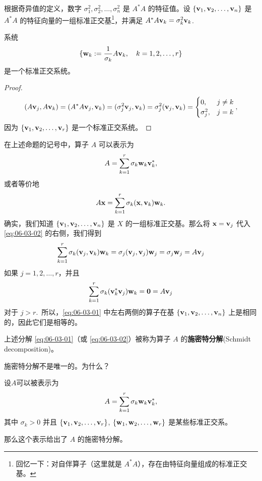 根据奇异值的定义，数字 $\sigma_1^2, \sigma_2^2, \dots, \sigma_n^2$ 是 $A^*A$ 的特征值。设 $\{\mathbf{v}_1, \mathbf{v}_2, \dots, \mathbf{v}_n\}$ 是 $A^*A$ 的特征向量的一组标准正交基\footnote{回忆一下：对自伴算子（这里就是 $A^*A$），存在由特征向量组成的标准正交基。}，并满足 $A^*A\mathbf{v}_k = \sigma_k^2 \mathbf{v}_k$.~

\begin{proposition}\label{stmt:06-03-06}
系统
$$\{\mathbf{w}_k := \frac{1}{\sigma_k} A\mathbf{v}_k,\quad k = 1, 2, \dots, r\}$$
是一个标准正交系统。
\end{proposition}

\begin{proof}$$(A\mathbf{v}_j, A\mathbf{v}_k) = (A^*A\mathbf{v}_j, \mathbf{v}_k) = (\sigma_j^2 \mathbf{v}_j, \mathbf{v}_k) = \sigma_j^2 (\mathbf{v}_j, \mathbf{v}_k) = \begin{cases} 0, & j \neq k \\ \sigma_j^2, & j = k \end{cases},$$因为 $\{\mathbf{v}_1, \mathbf{v}_2, \dots, \mathbf{v}_r\}$ 是一个标准正交系统。\end{proof}

在上述命题的记号中，算子 $A$ 可以表示为
\begin{equation}\label{eq:06-03-01}
A = \sum_{k=1}^r \sigma_k \mathbf{w}_k \mathbf{v}_k^*,
\end{equation}
或者等价地
\begin{equation}\label{eq:06-03-02}
A\mathbf{x} = \sum_{k=1}^r \sigma_k (\mathbf{x}, \mathbf{v}_k) \mathbf{w}_k.
\end{equation}
确实，我们知道 $\{\mathbf{v}_1, \mathbf{v}_2, \dots, \mathbf{v}_n\}$ 是 $X$ 的一组标准正交基。那么将 $\mathbf{x} = \mathbf{v}_j$ 代入 \eqref{eq:06-03-02} 的右侧，我们得到
$$\sum_{k=1}^r \sigma_k (\mathbf{v}_j, \mathbf{v}_k) \mathbf{w}_k = \sigma_j (\mathbf{v}_j, \mathbf{v}_j) \mathbf{w}_j = \sigma_j \mathbf{w}_j = A\mathbf{v}_j$$
如果 $j=1, 2, \dots, r$，并且
$$\sum_{k=1}^r \sigma_k (\mathbf{v}_k^* \mathbf{v}_j) \mathbf{w}_k = \mathbf{0} = A\mathbf{v}_j$$ 对于 $j > r$.~所以，\eqref{eq:06-03-01} 中左右两侧的算子在基 $\{\mathbf{v}_1, \mathbf{v}_2, \dots, \mathbf{v}_n\}$ 上是相同的，因此它们是相等的。

\begin{definition*}
上述分解 \eqref{eq:06-03-01}（或 \eqref{eq:06-03-02}）被称为算子 $A$ 的\textbf{施密特分解}(Schmidt decomposition)。
\end{definition*}

\begin{remark*}
施密特分解不是唯一的。为什么？
\end{remark*}


\begin{lemma}\label{stmt:06-03-07}设$A$可以被表示为
$$A = \sum_{k=1}^r \sigma_k \mathbf{w}_k \mathbf{v}_k^*,$$
其中 $\sigma_k > 0$ 并且 $\{\mathbf{v}_1, \mathbf{v}_2, \dots, \mathbf{v}_r\}$, $\{\mathbf{w}_1, \mathbf{w}_2, \dots, \mathbf{w}_r\}$ 是某些标准正交系。

那么这个表示给出了 $A$ 的施密特分解。\end{lemma}

